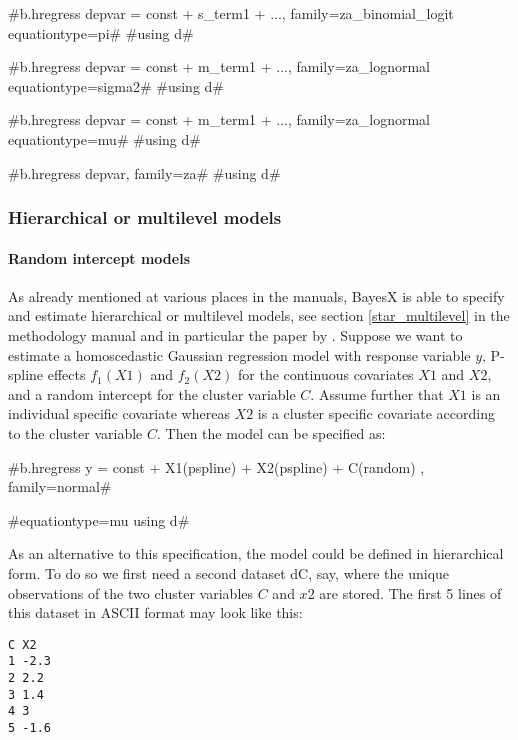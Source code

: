 #b.hregress depvar = const + s_term1 + ..., family=za_binomial_logit equationtype=pi#
#using d#

#b.hregress depvar = const + m_term1 + ..., family=za_lognormal equationtype=sigma2#
#using d#

#b.hregress depvar = const + m_term1 + ..., family=za_lognormal equationtype=mu#
#using d#

#b.hregress depvar, family=za#
#using d#



\subsubsection{Hierarchical or multilevel models}
 \label{mcmcregmultilevelsyntax}

\paragraph{Random intercept models}

$ $ \\

As already mentioned at various places in the manuals, BayesX is able to specify and estimate hierarchical or
multilevel models, see section \ref{star_multilevel} in the methodology manual and in particular the paper by
. Suppose we want to estimate a homoscedastic Gaussian regression model with response variable
$y$, P-spline effects $f_1(X1)$ and $f_2(X2)$ for the continuous covariates $X1$ and $X2$, and a random intercept for the
cluster variable $C$. Assume further that $X1$ is an individual specific covariate whereas $X2$ is a cluster specific covariate
according to the cluster variable $C$. Then the model can be specified as:

#b.hregress y = const + X1(pspline)  + X2(pspline) + C(random) , family=normal#

#equationtype=mu using d#

As an alternative to this specification, the model could be defined in hierarchical form. To do so we first need a second dataset dC, say,
where the unique observations of the two cluster variables $C$ and $x2$ are stored. The first 5 lines of this dataset in ASCII format may look like this:

\begin{verbatim}
C X2
1 -2.3
2 2.2
3 1.4
4 3
5 -1.6
\end{verbatim}

